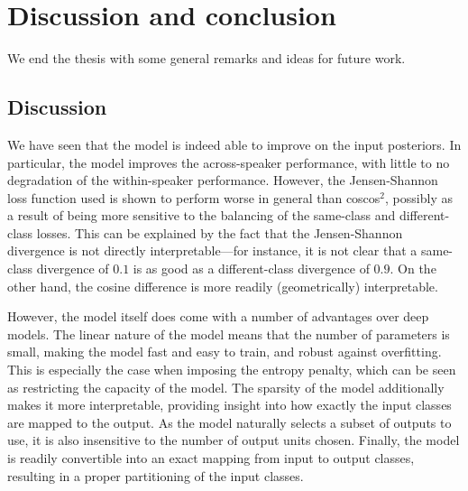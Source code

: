%
%
%

\chapter{Discussion and conclusion}
\label{ch:discussion}

We end the thesis with some general remarks and ideas for future work.

\section{Discussion}
We have seen that the model is indeed able to improve on the input posteriors.
In particular, the model improves the across-speaker performance, with little to no degradation of the within-speaker performance.
However, the Jensen-Shannon loss function used is shown to perform worse in general than coscos$^2$, possibly as a result of being more sensitive to the balancing of the same-class and different-class losses.
This can be explained by the fact that the Jensen-Shannon divergence is not directly interpretable---for instance, it is not clear that a same-class divergence of $0.1$ is as good as a different-class divergence of $0.9$.
On the other hand, the cosine difference is more readily (geometrically) interpretable.

However, the model itself does come with a number of advantages over deep models.
The linear nature of the model means that the number of parameters is small, making the model fast and easy to train, and robust against overfitting.
This is especially the case when imposing the entropy penalty, which can be seen as restricting the capacity of the model.
The sparsity of the model additionally makes it more interpretable, providing insight into how exactly the input classes are mapped to the output.
As the model naturally selects a subset of outputs to use, it is also insensitive to the number of output units chosen.
Finally, the model is readily convertible into an exact mapping from input to output classes, resulting in a proper partitioning of the input classes.

